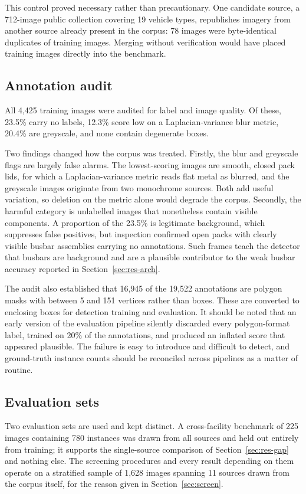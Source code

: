 \documentclass[conference]{IEEEtran}
\begin{document}
This control proved necessary rather than precautionary. One candidate source, a
712-image public collection covering 19 vehicle types, republishes imagery from
another source already present in the corpus: 78 images were byte-identical
duplicates of training images. Merging without verification would have placed
training images directly into the benchmark.

\subsection{Annotation audit}
\label{sec:audit}
All 4,425 training images were audited for label and image quality. Of these,
23.5\% carry no labels, 12.3\% score low on a Laplacian-variance blur metric,
20.4\% are greyscale, and none contain degenerate boxes.

Two findings changed how the corpus was treated. Firstly, the blur and greyscale
flags are largely false alarms. The lowest-scoring images are smooth, closed pack
lids, for which a Laplacian-variance metric reads flat metal as blurred, and the
greyscale images originate from two monochrome sources. Both add useful
variation, so deletion on the metric alone would degrade the corpus. Secondly,
the harmful category is unlabelled images that nonetheless contain visible
components. A proportion of the 23.5\% is legitimate background, which suppresses
false positives, but inspection confirmed open packs with clearly visible busbar
assemblies carrying no annotations. Such frames teach the detector that busbars
are background and are a plausible contributor to the weak busbar accuracy
reported in Section~\ref{sec:res-arch}.

The audit also established that 16,945 of the 19,522 annotations are polygon
masks with between 5 and 151 vertices rather than boxes. These are converted to
enclosing boxes for detection training and evaluation. It should be noted that an
early version of the evaluation pipeline silently discarded every polygon-format
label, trained on 20\% of the annotations, and produced an inflated score that
appeared plausible. The failure is easy to introduce and difficult to detect, and
ground-truth instance counts should be reconciled across pipelines as a matter of
routine.

\subsection{Evaluation sets}
Two evaluation sets are used and kept distinct. A cross-facility benchmark of 225
images containing 780 instances was drawn from all sources and held out entirely from
training; it supports the single-source comparison of Section~\ref{sec:res-gap} and
nothing else. The screening procedures and every result depending on them operate on a
stratified sample of 1,628 images spanning 11 sources drawn from the corpus itself,
for the reason given in Section~\ref{sec:screen}.
\end{document}
